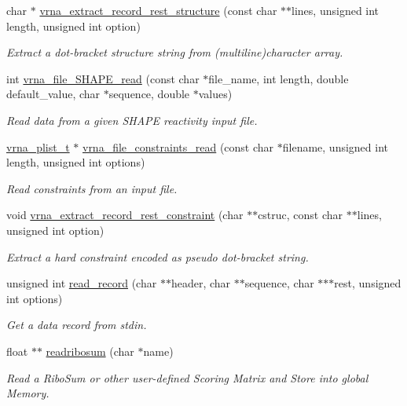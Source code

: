 \begin{DoxyCompactItemize}
char $\ast$ \hyperlink{group__file__utils_gad37cbb63a05eed63ba25c91628409be0}{vrna\+\_\+extract\+\_\+record\+\_\+rest\+\_\+structure} (const char $\ast$$\ast$lines, unsigned int length, unsigned int option)
\begin{DoxyCompactList}\small\item\em Extract a dot-\/bracket structure string from (multiline)character array. \end{DoxyCompactList}\item 
int \hyperlink{group__file__utils_ga646ebf45450a69a7f2533f9ecd283a32}{vrna\+\_\+file\+\_\+\+S\+H\+A\+P\+E\+\_\+read} (const char $\ast$file\+\_\+name, int length, double default\+\_\+value, char $\ast$sequence, double $\ast$values)
\begin{DoxyCompactList}\small\item\em Read data from a given S\+H\+A\+P\+E reactivity input file. \end{DoxyCompactList}\item 
\hyperlink{group__data__structures_ga8e4eb5e1bfc95776559575beb359af87}{vrna\+\_\+plist\+\_\+t} $\ast$ \hyperlink{group__file__utils_gae33323c53765ecbbc410d9de2d495432}{vrna\+\_\+file\+\_\+constraints\+\_\+read} (const char $\ast$filename, unsigned int length, unsigned int options)
\begin{DoxyCompactList}\small\item\em Read constraints from an input file. \end{DoxyCompactList}\item 
void \hyperlink{group__file__utils_ga55a9ae6dfeecc1b3f0c2acf6fa796c15}{vrna\+\_\+extract\+\_\+record\+\_\+rest\+\_\+constraint} (char $\ast$$\ast$cstruc, const char $\ast$$\ast$lines, unsigned int option)
\begin{DoxyCompactList}\small\item\em Extract a hard constraint encoded as pseudo dot-\/bracket string. \end{DoxyCompactList}\item 
unsigned int \hyperlink{group__file__utils_gafd194a69af9d92b5b0412a7627ac1595}{read\+\_\+record} (char $\ast$$\ast$header, char $\ast$$\ast$sequence, char $\ast$$\ast$$\ast$rest, unsigned int options)
\begin{DoxyCompactList}\small\item\em Get a data record from stdin. \end{DoxyCompactList}\item 
\hypertarget{group__file__utils_ga5e125c9586fcd4e2e1559fe76f7289cc}{}float $\ast$$\ast$ \hyperlink{group__file__utils_ga5e125c9586fcd4e2e1559fe76f7289cc}{readribosum} (char $\ast$name)\label{group__file__utils_ga5e125c9586fcd4e2e1559fe76f7289cc}

\begin{DoxyCompactList}\small\item\em Read a Ribo\+Sum or other user-\/defined Scoring Matrix and Store into global Memory. \end{DoxyCompactList}\end{DoxyCompactItemize}


